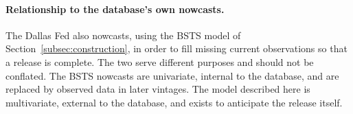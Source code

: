 \paragraph{Relationship to the database's own nowcasts.}
The Dallas Fed also nowcasts, using the BSTS model of
Section~\ref{subsec:construction}, in order to fill missing current
observations so that a release is complete. The two serve different purposes
and should not be conflated. The BSTS nowcasts are univariate, internal to
the database, and are replaced by observed data in later vintages. The model
described here is multivariate, external to the database, and exists to
anticipate the release itself.
